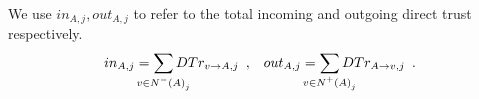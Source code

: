 \begin{definition}
\label{inouttrust}
  We use $in_{A, j}, out_{A, j}$ to refer to the total incoming and outgoing direct trust respectively.
  \begin{align}
    in_{A, j} = \sum\limits_{\mathclap{v \in N^{-}\left(A\right)_j}}DTr_{v \rightarrow A, j} \enspace, &&
    out_{A, j} = \sum\limits_{\mathclap{v \in N^{+}\left(A\right)_j}}DTr_{A \rightarrow v, j} \enspace.
  \end{align}
\end{definition}
